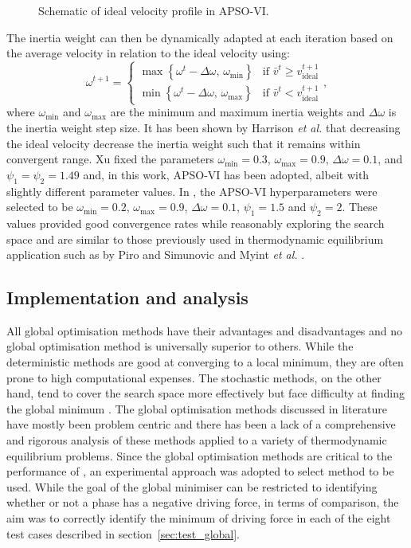\begin{enumerate}
\begin{figure}[htbp]
				\caption{Schematic of ideal velocity profile in APSO-VI.}
				\label{fig:APSO-ideal_v}
			\end{figure}
			The inertia weight can then be dynamically adapted at each iteration based on the average velocity in relation to the ideal velocity \cite{Harrison:2018aa} using:
			\begin{equation}
				\omega^{t+1} =  \begin{cases}
								\max \left\{ \omega^t - \Delta \omega, \, \omega_\text{min}\right\}& \text{if } \bar{v}^t \geq  {v}_\text{ideal}^{t+1}\\
								\min \left\{ \omega^t - \Delta \omega, \, \omega_\text{max}\right\}& \text{if } \bar{v}^t <  {v}_\text{ideal}^{t+1}
							\end{cases},
			\end{equation}
			where $\omega_\text{min}$ and $\omega_\text{max}$ are the minimum and maximum inertia weights and $\Delta \omega$ is the inertia weight step size. It has been shown by Harrison \textit{et al.} \cite{Harrison:2016aa} that decreasing the ideal velocity decrease the inertia weight such that it remains within convergent range. Xu fixed the parameters $\omega_\text{min} = 0.3$, $\omega_\text{max} = 0.9$, $\Delta \omega = 0.1$, and $\psi_1 = \psi_2 = 1.49$ \cite{Xu:2013aa} and, in this work, APSO-VI has been adopted, albeit with slightly different parameter values. In {\GEM}, the APSO-VI hyperparameters were selected to be $\omega_\text{min} = 0.2$, $\omega_\text{max} = 0.9$, $\Delta \omega = 0.1$, $\psi_1 = 1.5$ and  $\psi_2 = 2$. These values provided good convergence rates while reasonably exploring the search space and are similar to those previously used in thermodynamic equilibrium application such as by Piro and Simunovic \cite{Piro16} and Myint \textit{et al.} \cite{Myint:2021aa}.
	\end{enumerate}

	
	\subsection{Implementation and analysis}
	All global optimisation methods have their advantages and disadvantages and no global optimisation method is universally superior to others. While the deterministic methods are good at converging to a local minimum, they are often prone to high computational expenses. The stochastic methods, on the other hand, tend to cover the search space more effectively but face difficulty at finding the global minimum \cite{Piro16}. The global optimisation methods discussed in literature have mostly been problem centric and there has been a lack of a comprehensive and rigorous analysis of these methods applied to a variety of thermodynamic equilibrium problems. 	Since the global optimisation methods are critical to the performance of {\GEM}, an experimental approach was adopted to select method to be used. While the goal of the global minimiser can be restricted to identifying whether or not a phase has a negative driving force, in terms of comparison, the aim was to correctly identify the minimum of driving force in each of the eight test cases described in section~\ref{sec:test_global}.  
	
